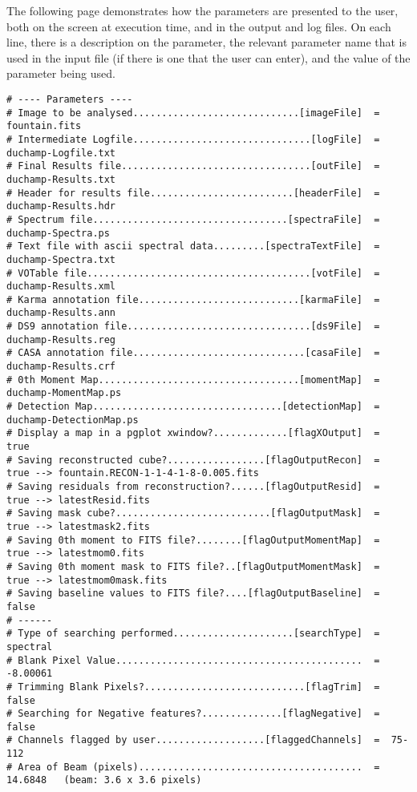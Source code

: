 The following page demonstrates how the parameters are presented to
the user, both on the screen at execution time, and in the output and
log files. On each line, there is a description on the parameter, the
relevant parameter name that is used in the input file (if there is
one that the user can enter), and the value of the parameter being
used.

\newpage
{\scriptsize
\begin{verbatim}
# ---- Parameters ----
# Image to be analysed.............................[imageFile]  =  fountain.fits
# Intermediate Logfile...............................[logFile]  =  duchamp-Logfile.txt
# Final Results file.................................[outFile]  =  duchamp-Results.txt
# Header for results file.........................[headerFile]  =  duchamp-Results.hdr
# Spectrum file..................................[spectraFile]  =  duchamp-Spectra.ps
# Text file with ascii spectral data.........[spectraTextFile]  =  duchamp-Spectra.txt
# VOTable file.......................................[votFile]  =  duchamp-Results.xml
# Karma annotation file............................[karmaFile]  =  duchamp-Results.ann
# DS9 annotation file................................[ds9File]  =  duchamp-Results.reg
# CASA annotation file..............................[casaFile]  =  duchamp-Results.crf
# 0th Moment Map...................................[momentMap]  =  duchamp-MomentMap.ps
# Detection Map.................................[detectionMap]  =  duchamp-DetectionMap.ps
# Display a map in a pgplot xwindow?.............[flagXOutput]  =  true
# Saving reconstructed cube?.................[flagOutputRecon]  =  true --> fountain.RECON-1-1-4-1-8-0.005.fits
# Saving residuals from reconstruction?......[flagOutputResid]  =  true --> latestResid.fits
# Saving mask cube?...........................[flagOutputMask]  =  true --> latestmask2.fits
# Saving 0th moment to FITS file?........[flagOutputMomentMap]  =  true --> latestmom0.fits
# Saving 0th moment mask to FITS file?..[flagOutputMomentMask]  =  true --> latestmom0mask.fits
# Saving baseline values to FITS file?....[flagOutputBaseline]  =  false
# ------
# Type of searching performed.....................[searchType]  =  spectral
# Blank Pixel Value...........................................  =  -8.00061
# Trimming Blank Pixels?............................[flagTrim]  =  false
# Searching for Negative features?..............[flagNegative]  =  false
# Channels flagged by user...................[flaggedChannels]  =  75-112
# Area of Beam (pixels).......................................  =  14.6848   (beam: 3.6 x 3.6 pixels)

\end{verbatim}}
